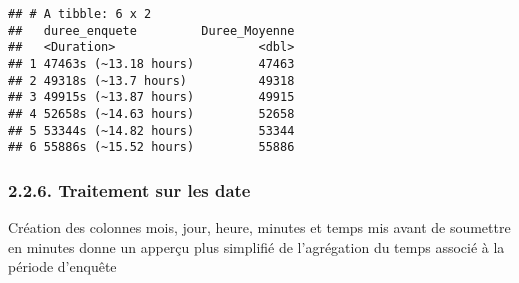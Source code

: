 \documentclass[
]{article}
\newenvironment{Shaded}{\begin{snugshade}}{\end{snugshade}}
\newcommand{\AttributeTok}[1]{\textcolor[rgb]{0.13,0.29,0.53}{#1}}
\newcommand{\CommentTok}[1]{\textcolor[rgb]{0.56,0.35,0.01}{\textit{#1}}}
\newcommand{\FunctionTok}[1]{\textcolor[rgb]{0.13,0.29,0.53}{\textbf{#1}}}
\newcommand{\NormalTok}[1]{#1}
\newcommand{\OtherTok}[1]{\textcolor[rgb]{0.56,0.35,0.01}{#1}}
\newcommand{\SpecialCharTok}[1]{\textcolor[rgb]{0.81,0.36,0.00}{\textbf{#1}}}
\newcommand{\StringTok}[1]{\textcolor[rgb]{0.31,0.60,0.02}{#1}}
\begin{document}
\begin{verbatim}
## # A tibble: 6 x 2
##   duree_enquete         Duree_Moyenne
##   <Duration>                    <dbl>
## 1 47463s (~13.18 hours)         47463
## 2 49318s (~13.7 hours)          49318
## 3 49915s (~13.87 hours)         49915
## 4 52658s (~14.63 hours)         52658
## 5 53344s (~14.82 hours)         53344
## 6 55886s (~15.52 hours)         55886
\end{verbatim}

\hypertarget{traitement-sur-les-date}{%
\subsubsection{2.2.6. Traitement sur les
date}\label{traitement-sur-les-date}}

Création des colonnes mois, jour, heure, minutes et temps mis avant de
soumettre en minutes donne un apperçu plus simplifié de l'agrégation du
temps associé à la période d'enquête

\begin{Shaded}
\end{Shaded}
\end{document}
